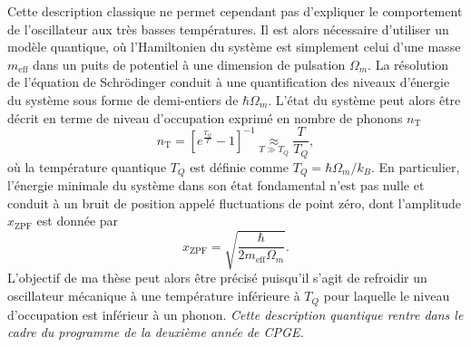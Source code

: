 \documentclass[12pt,a4paper]{article}
\begin{document}
Cette description classique ne permet cependant pas d'expliquer le comportement de l'oscillateur aux très basses températures.
Il est alors nécessaire d'utiliser un modèle quantique, où l'Hamiltonien du système est simplement celui d'une masse $m_\mathrm{eff}$ dans un puits de potentiel à une dimension de pulsation $\Omega_m$.
La résolution de l'équation de Schrödinger conduit à une quantification des niveaux d'énergie du système sous forme de demi-entiers de $\hbar\Omega_m$.
L'état du système peut alors être décrit en terme de niveau d'occupation exprimé en nombre de phonons $n_\mathrm{T}$
\begin{equation}
n_\mathrm{T} = \left[ e^\frac{T_Q}{T} -1\right]^{-1} \underset{T\gg T_Q}{\approx} \frac{T}{T_Q},
\end{equation}
où la température quantique $T_Q$ est définie comme $T_Q = \hbar\Omega_m/k_B$.
En particulier, l'énergie minimale du système dans son état fondamental n'est pas nulle et conduit à un bruit de position appelé fluctuations de point zéro, dont l'amplitude $x_\mathrm{ZPF}$ est donnée par
\begin{equation}
x_\mathrm{ZPF}=\sqrt{\frac{\hbar}{2m_\mathrm{eff}\Omega_m}}.
\end{equation}
L'objectif de ma thèse peut alors être précisé puisqu'il s'agit de refroidir un oscillateur mécanique à une température inférieure à $T_Q$ pour laquelle le niveau d'occupation est inférieur à un phonon.
\emph{Cette description quantique rentre dans le cadre du programme de la deuxième année de CPGE.}
\end{document}

